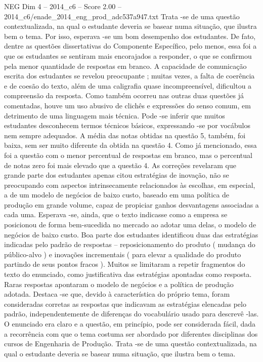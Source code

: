 \begin{textsample}{NEG Dim 4 – 2014\_c6 – Score 2.00 – 2014\_c6/enade\_2014\_eng\_prod\_adc537a947.txt}
Trata -se de uma questão contextualizada, na qual o estudante deveria se basear numa situação, que ilustra bem o tema.
Por isso, esperava -se um bom desempenho dos estudantes.
De fato, dentre as questões dissertativas do Componente Específico, pelo menos, essa foi a que os estudantes se sentiram mais encorajados a responder, o que se confirmou pela menor quantidade de respostas em branco.
A capacidade de comunicação escrita dos estudantes se revelou preocupante ; muitas vezes, a falta de coerência e de coesão do texto, além de uma caligrafia quase incompreensível, dificultou a compreensão da resposta.
Como também ocorreu nas outras duas questões já comentadas, houve um uso abusivo de clichês e expressões do senso comum, em detrimento de uma linguagem mais técnica.
Pode -se inferir que muitos estudantes desconhecem termos técnicos básicos, expressando -se por vocábulos nem sempre adequados.
A média das notas obtidas na questão 5, também, foi baixa, sem ser muito diferente da obtida na questão 4.
Como já mencionado, essa foi a questão com o menor percentual de respostas em branco, mas o percentual de notas zero foi mais elevado que a questão 4.
As correções revelaram que grande parte dos estudantes apenas citou estratégias de inovação, não se preocupando com aspectos intrinsecamente relacionados às escolhas, em especial, a de um modelo de negócios de baixo custo, baseado em uma política de produção em grande volume, capaz de propiciar ganhos desvantagens associadas a cada uma.
Esperava -se, ainda, que o texto indicasse como a empresa se posicionou de forma bem-sucedida no mercado ao adotar uma delas, o modelo de negócios de baixo custo.
Boa parte dos estudantes identificou duas das estratégias indicadas pelo padrão de respostas – reposicionamento do produto ( mudança do público-alvo ) e inovações incrementais ( para elevar a qualidade do produto partindo de seus pontos fracos ).
Muitos se limitaram a repetir fragmentos do texto do enunciado, como justificativa das estratégias apontadas como resposta.
Raras respostas apontaram o modelo de negócios e a política de produção adotada.
Destaca -se que, devido à característica do próprio tema, foram consideradas corretas as respostas que indicavam as estratégias elencadas pelo padrão, independentemente de diferenças do vocabulário usado para descrevê -las.
O enunciado era claro e a questão, em princípio, pode ser considerada fácil, dada a recorrência com que o tema costuma ser abordado por diferentes disciplinas dos cursos de Engenharia de Produção.
Trata -se de uma questão contextualizada, na qual o estudante deveria se basear numa situação, que ilustra bem o tema.

\end{textsample}
